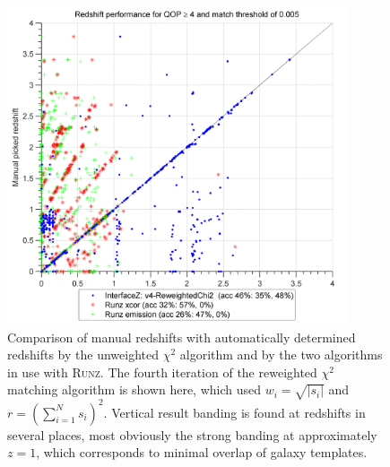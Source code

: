 \documentclass[titlesmallcaps, examinerscopy, copyrightpage]{uqthesis}
\newcommand{\runz}{\textsc{Runz}}
\newcommand{\brac}[1]{\left( #1 \right)}
\newcommand\abs[1]{\left|#1\right|}
\begin{document}
\begin{figure}[ht!]
\includegraphics[width=0.9\textwidth]{images/Fullv4-ReweightedChi2.png} 
\centering
\caption{Comparison of manual redshifts with automatically determined redshifts by the unweighted $\chi^2$ algorithm and by the two algorithms in use with \runz{}. The fourth iteration of the reweighted $\chi^2$ matching algorithm is shown here, which used $w_i = \sqrt{\abs{s_i}}$ and $r = \brac{\sum_{i=1}^N s_i}^{2}$. Vertical result banding is found at redshifts in several places, most obviously the strong banding at approximately $z=1$, which corresponds to minimal overlap of galaxy templates.}
\label{fig:vertical}
\end{figure}
\end{document}
